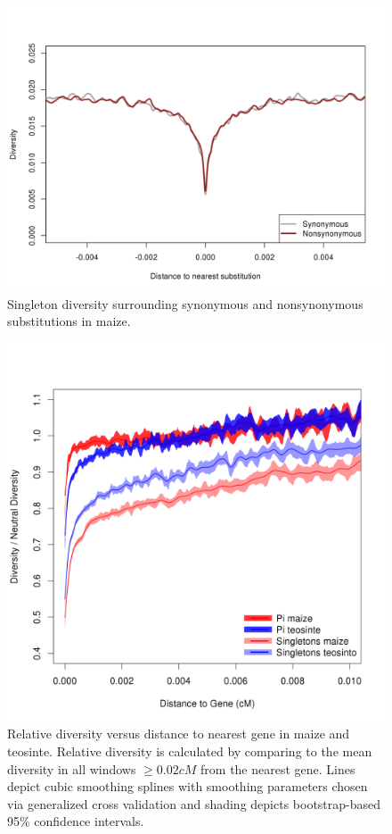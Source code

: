 \begin{figure}
  \includegraphics[width=\textwidth]{FigsAndFiles/plotDiversity_TvM_Singletons.png}
\caption{ Singleton diversity surrounding synonymous and nonsynonymous
  substitutions in maize. \label{sFig:singleton}}
\end{figure}
\clearpage


\begin{figure}
  \includegraphics[width=\textwidth]{FigsAndFiles/distanceToGene_WithSignificance_Folded2_maizeAndTeoSingleVsPi.png}
\caption{ Relative diversity versus distance to nearest gene in maize and teosinte. Relative diversity is calculated by comparing to the mean diversity in all windows $\geq 0.02 cM$ from the nearest gene. Lines depict cubic smoothing splines with smoothing parameters chosen via generalized cross validation and shading depicts bootstrap-based 95\% confidence intervals.  \label{sFig:singletonPi}}
\end{figure}
\clearpage


